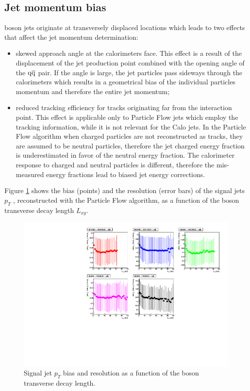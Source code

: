 \subsection{Jet momentum bias}
\label{subsec:ptbias}

\X boson jets originate at transversely displaced locations which leads to two effects that affect the jet 
momentum determination:
\begin{itemize}
 \item skewed approach angle at the calorimeters face. This effect is a result of the displacement 
of the jet production point combined with the opening angle of the $\mathrm{q}\overline{\mathrm{q}}$ pair.
If the angle is large, the jet particles pass sideways through the calorimeters 
 which results in a geometrical bias of the individual
particles momentum and therefore the entire jet momentum;  
 \item reduced tracking efficiency for tracks originating far from the interaction point. This effect
is applicable only to Particle Flow jets which employ the tracking information, while it is not relevant for the 
Calo jets. In the Particle Flow algorithm when charged particles
are not reconstructed as tracks, they are assumed to be neutral particles, therefore the jet 
charged energy fraction is underestimated in favor of the neutral energy fraction. 
The calorimeter response to charged and neutral particles is different,
therefore the mis-measured energy fractions lead to biased jet energy corrections.
\end{itemize}
Figure \ref{fig:jetbias} shows the bias (points) and the resolution (error bars) of the signal jets $p_T$ 
, reconstructed with the Particle Flow algorithm, as a function of the \X boson transverse decay length $L_{xy}$.

\begin{figure}[htbp]
\centering
\includegraphics[width=0.99\textwidth]{plots/signal/biaslxy.pdf}
\caption{Signal jet $p_T$ bias and resolution as a function of the \X boson transverse decay length.\label{fig:jetbias}}
\end{figure} 
   
